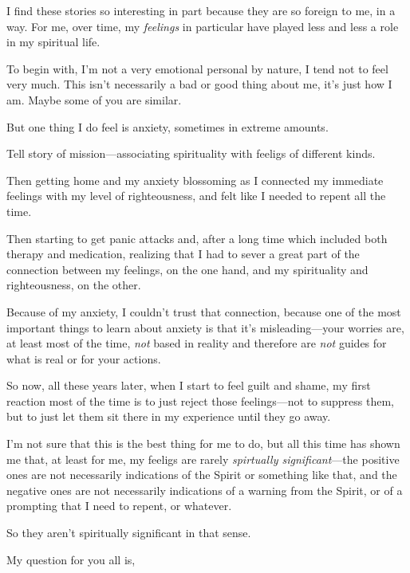 \begin{compactitem}
			\item I find these stories so interesting in part because they are so foreign to me, in a way. For me, over time, my \textit{feelings} in particular have played less and less a role in my spiritual life.
				\begin{compactitem}
					\item To begin with, I'm not a very emotional personal by nature, I tend not to feel very much. This isn't necessarily a bad or good thing about me, it's just how I am. Maybe some of you are similar.
					\item But one thing I do feel is anxiety, sometimes in extreme amounts.
					\item Tell story of mission---associating spirituality with feeligs of different kinds.
					\item Then getting home and my anxiety blossoming as I connected my immediate feelings with my level of righteousness, and felt like I needed to repent all the time.
					\item Then starting to get panic attacks and, after a long time which included both therapy and medication, realizing that I had to sever a great part of the connection between my feelings, on the one hand, and my spirituality and righteousness, on the other.
					\item Because of my anxiety, I couldn't trust that connection, because one of the most important things to learn about anxiety is that it's misleading---your worries are, at least most of the time, \textit{not} based in reality and therefore are \textit{not} guides for what is real or for your actions.
					\item So now, all these years later, when I start to feel guilt and shame, my first reaction most of the time is to just reject those feelings---not to suppress them, but to just let them sit there in my experience until they go away.
					\item I'm not sure that this is the best thing for me to do, but all this time has shown me that, at least for me, my feeligs are rarely \textit{spirtually significant}---the positive ones are not necessarily indications of the Spirit or something like that, and the negative ones are not necessarily indications of a warning from the Spirit, or of a prompting that I need to repent, or whatever.
					\item So they aren't spiritually significant in that sense.
					\item My question for you all is, 
				\end{compactitem}
				

\end{compactitem}
